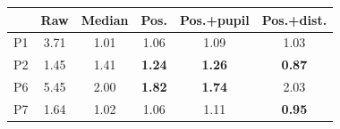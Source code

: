 \begin{tabular}{@{}lccccc@{}}
\toprule
 & Raw & Median & Pos. & Pos.+pupil & Pos.+dist. \\
\midrule
P1 & 3.71 & 1.01 & 1.06 & 1.09 & 1.03 \\
P2 & 1.45 & 1.41 & \textbf{1.24} & \textbf{1.26} & \textbf{0.87} \\
P6 & 5.45 & 2.00 & \textbf{1.82} & \textbf{1.74} & 2.03 \\
P7 & 1.64 & 1.02 & 1.06 & 1.11 & \textbf{0.95} \\
\bottomrule
\end{tabular}
